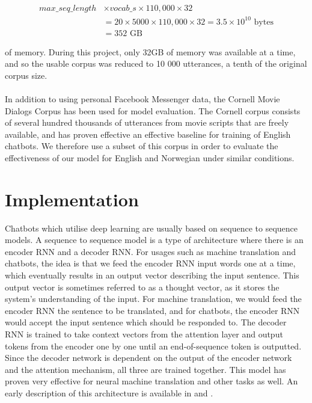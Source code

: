 \documentclass{article}
\begin{document}
\begin{align*}
  max\_seq\_length &\times vocab\_s \times 110,000 \times 32 \\
  &= 20 \times 5000 \times 110,000 \times 32 = 3.5 \times 10^{10} \text{ bytes}\\
  &= 352 \text{ GB}
\end{align*}

of memory. During this project, only 32GB of memory was available at a
time, and so the usable corpus was reduced to 10 000 utterances, a tenth
of the original corpus size.

\paragraph{}
In addition to using personal Facebook Messenger data, the Cornell Movie
Dialogs Corpus \cite{cornell-corpus} has been used for model evaluation.
The Cornell corpus consists of several hundred thousands of utterances
from movie scripts that are freely available, and has proven effective
an effective baseline for training of English chatbots. We therefore use
a subset of this corpus in order to evaluate the effectiveness of our model
for English and Norwegian under similar conditions.

\section*{Implementation}
Chatbots which utilise deep learning are usually based on sequence to sequence
models. A sequence to sequence model is a type of architecture where there is
an encoder RNN and a decoder RNN. For usages such as machine translation and
chatbots, the idea is that we feed the encoder RNN input words one at a time,
which eventually results in an output vector describing the input sentence.
This output vector is sometimes referred to as a thought vector, as it stores
the system's understanding of the input. For machine translation, we would feed
the encoder RNN the sentence to be translated, and for chatbots, the encoder
RNN would accept the input sentence which should be responded to. The decoder
RNN is trained to take context vectors from the attention layer and output
tokens from the encoder one by one until an end-of-sequence token is outputted.
Since the decoder network is dependent on the output of the encoder network and
the attention mechanism, all three are trained together. This model has proven
very effective for neural machine translation and other tasks as well. An early
description of this architecture is available in \cite{Cho2014} and
\cite{Bahdanau2015}.
\end{document}
